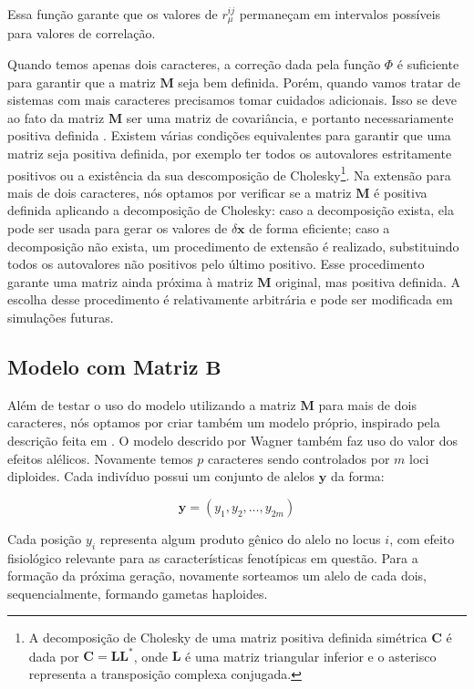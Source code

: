 Essa função garante que os valores de $r_\mu^{ij}$ permaneçam em
intervalos possíveis para valores de correlação.

Quando temos apenas dois caracteres, a correção dada pela função $\Phi$ é
suficiente para garantir que a matriz $\mathbf{M}$ seja bem definida.
Porém, quando vamos tratar de sistemas com mais caracteres precisamos
tomar cuidados adicionais.
Isso se deve ao fato da matriz $\mathbf{M}$ ser uma matriz de covariância, e
portanto necessariamente positiva definida \citep{Anderson1984}.
Existem várias condições equivalentes para garantir que uma matriz seja
positiva definida, por exemplo ter todos os autovalores estritamente
positivos ou a existência da sua descomposição de Cholesky\footnote{A
decomposição de Cholesky de uma matriz positiva definida simétrica
$\mathbf{C}$ é dada por $\mathbf{C}=\mathbf{LL}^*$, onde $\mathbf{L}$ é uma matriz triangular inferior e o asterisco
representa a transposição complexa conjugada.}.
Na extensão para mais de dois caracteres, nós optamos por verificar se a
matriz $\mathbf{M}$ é positiva definida aplicando a decomposição de Cholesky:
caso a decomposição exista, ela pode ser usada para gerar os valores
de $\delta \mathbf{x}$ de forma eficiente; caso a decomposição não exista, um
procedimento de extensão \citep{Marroig2012} é realizado,
substituindo todos os autovalores não positivos pelo último positivo.
Esse procedimento garante uma matriz ainda próxima à matriz $\mathbf{M}$
original, mas positiva definida.
A escolha desse procedimento é relativamente arbitrária e pode ser
modificada em simulações futuras.

\subsection{Modelo com Matriz $\mathbf{B}$}\label{cap2:mem:ModelB}

Além de testar o uso do modelo utilizando a matriz $\mathbf{M}$ para mais de dois
caracteres, nós optamos por criar também um modelo próprio, inspirado pela
descrição feita em \cite{Wagner1984}.
O modelo descrido por Wagner também faz uso do valor dos efeitos
alélicos.
Novamente temos $p$ caracteres sendo controlados por $m$ loci diploides.
Cada indivíduo possui um conjunto de alelos $\mathbf{y}$ da forma:

\begin{equation}
    \mathbf{y} = (y_1, y_2, \ldots, y_{2m})
\end{equation}

Cada posição $y_i$ representa algum produto gênico do alelo no
locus $i$, com efeito fisiológico relevante para as características
fenotípicas em questão.
Para a formação da próxima geração, novamente sorteamos um alelo de cada
dois, sequencialmente, formando gametas haploides.

